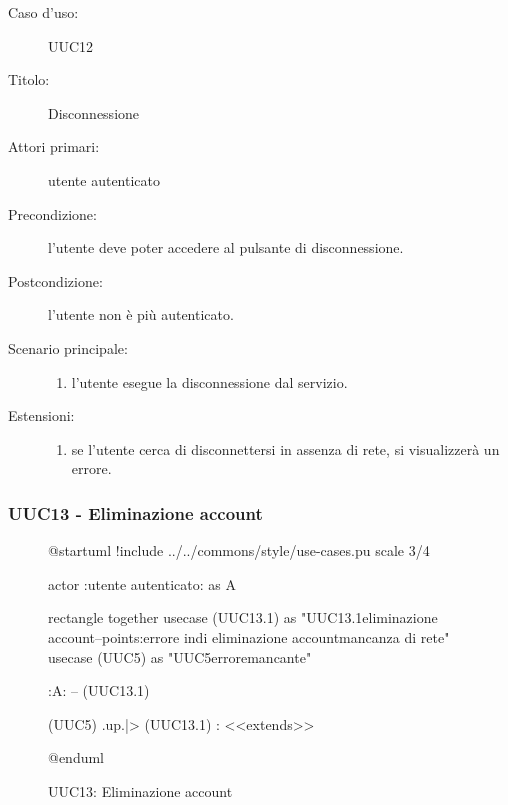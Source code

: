 \documentclass[casi-duso]{subfiles}
\begin{document}
  \begin{description}
  \item[Caso d’uso:] UUC12
  \item[Titolo:] Disconnessione
  \item[Attori primari:] utente autenticato
  \item[Precondizione:] l'utente deve poter accedere al pulsante di disconnessione.
  \item[Postcondizione:] l'utente non è più autenticato.
  \item[Scenario principale:]
        \begin{enumerate}
          \item l'utente esegue la disconnessione dal servizio.
        \end{enumerate}
  \item[Estensioni:]
        \begin{enumerate}
          \item se l'utente cerca di disconnettersi in assenza di rete, si visualizzerà un errore.
        \end{enumerate}
\end{description}

\subsubsection{UUC13 - Eliminazione account}%
\label{subsub:UUC13utente}

\begin{figure}[h!] 
  \centering 
  \begin{plantuml}
  @startuml
  !include ../../commons/style/use-cases.pu
  scale 3/4
  
  actor :utente autenticato: as A

  rectangle {
    together {
      usecase (UUC13.1) as "UUC13.1\nConferma eliminazione account\n--\nExtension points:\nVisualizzazione errore in\ncaso di eliminazione account\nin mancanza di rete"
      usecase (UUC5) as "UUC5\nVisualizzazione errore\nrete mancante"
    }
  }

  :A: -- (UUC13.1)

  (UUC5) .up.|> (UUC13.1) : <<extends>>

  @enduml
  \end{plantuml} 
  \caption{UUC13: Eliminazione account} 
  \label{fig:uuc13} 
\end{figure}
\end{document}
